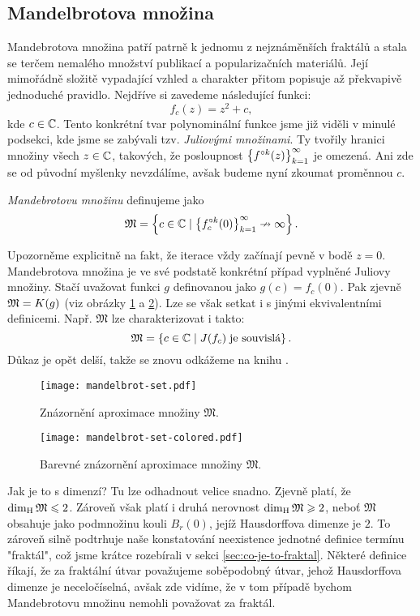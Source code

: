 \subsection{Mandelbrotova množina}\label{subsec:mandebrotova-mnozina}

Mandebrotova množina patří patrně k jednomu z nejznáměnších fraktálů a stala se terčem nemalého množství publikací a popularizačních materiálů. Její mimořádně složitě vypadající vzhled a charakter přitom popisuje až překvapivě jednoduché pravidlo. Nejdříve si zavedeme následující funkci:
\[f_c(z)=z^2+c,\]
kde $c\in\mathbb{C}$. Tento konkrétní tvar polynominální funkce jsme již viděli v minulé podsekci, kde jsme se zabývali tzv. \emph{Juliovými množinami}. Ty tvořily hranici množiny všech $z\in\mathbb{C}$, takových, že posloupnost $\left\{f^{\circ k}(z)\right\}_{k=1}^\infty$ je omezená. Ani zde se od původní myšlenky nevzdálíme, avšak budeme nyní zkoumat proměnnou $c$.
\begin{definition}\label{def:mandebrotova-mnozina}
    \emph{Mandebrotovu množinu} definujeme jako
    \[\mathfrak{M}=\left\{c\in\mathbb{C}\mid \left\{f_c^{\circ k}(0)\right\}_{k=1}^\infty\nrightarrow\infty\right\}.\]
\end{definition}
Upozorněme explicitně na fakt, že iterace vždy začínají pevně v bodě $z=0$. Mandebrotova množina je ve své podstatě konkrétní případ vyplněné Juliovy množiny. Stačí uvažovat funkci $g$ definovanou jako $g(c)=f_c(0)$. Pak zjevně $\mathfrak{M}=K(g)$ (viz obrázky \ref{fig:znazorneni-mandebrotovy-mnoziny} a \ref{fig:znazorneni-mandebrotovy-mnoziny-vybarveno}). Lze se však setkat i s jinými ekvivalentními definicemi. Např. $\mathfrak{M}$ lze charakterizovat i takto:
\[\mathfrak{M}=\left\{c\in\mathbb{C}\mid J(f_c)\;\text{je souvislá}\right\}.\]
Důkaz je opět delší, takže se znovu odkážeme na knihu \citep[str. 245]{Falconer1989}.
\begin{figure}[h]
    \centering
    \texttt{[image: mandelbrot-set.pdf]}
    \caption{Znázornění aproximace množiny $\mathfrak{M}$.}
    \label{fig:znazorneni-mandebrotovy-mnoziny}
\end{figure}
\begin{figure}[h]
    \centering
    \texttt{[image: mandelbrot-set-colored.pdf]}
    \caption{Barevné znázornění aproximace množiny $\mathfrak{M}$.}
    \label{fig:znazorneni-mandebrotovy-mnoziny-vybarveno}
\end{figure}
Jak je to s dimenzí? Tu lze odhadnout velice snadno. Zjevně platí, že $\operatorname{dim_H}{\mathfrak{M}}\leqslant 2$. Zároveň však platí i druhá nerovnost $\operatorname{dim_H}{\mathfrak{M}}\geqslant 2$, neboť $\mathfrak{M}$ obsahuje jako podmnožinu kouli $B_r(0)$, jejíž Hausdorffova dimenze je $2$. To zároveň silně podtrhuje naše konstatování neexistence jednotné definice termínu "fraktál", což jsme krátce rozebírali v sekci \ref{sec:co-je-to-fraktal}. Některé definice říkají, že za fraktální útvar považujeme soběpodobný útvar, jehož Hausdorffova dimenze je neceločíselná, avšak zde vidíme, že v tom případě bychom Mandebrotovu množinu nemohli považovat za fraktál.